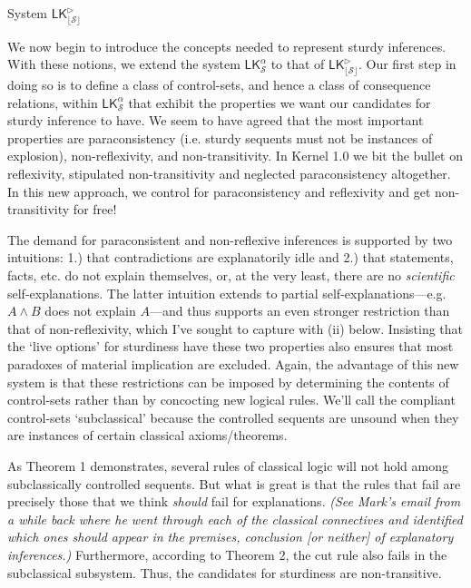 \documentclass{article}                     %
\theoremstyle{theorem}
\theoremstyle{corollary}
\theoremstyle{lemma}
\theoremstyle{definition}
\theoremstyle{remark}
\theoremstyle{definition}
\theoremstyle{notation}
\theoremstyle{definition}
\theoremstyle{proposition}
\theoremstyle{definition}
\begin{document}
\newpage



{\large System $ \mathsf{LK}^{\rhd}_{\mathcal{\lfloor S \rfloor}} $ }
\vspace{2mm}

We now begin to introduce the concepts needed to represent sturdy inferences. With these notions, we extend the system $ \mathsf{LK}^\alpha_\mathcal{S} $ to that of $ \mathsf{LK}^\rhd_\mathcal{\lfloor S \rfloor} $. Our first step in doing so is to define a class of control-sets, and hence a class of consequence relations, within $ \mathsf{LK}^\alpha_\mathcal{S} $ that exhibit the properties we want our candidates for sturdy inference to have. We seem to have agreed that the most important properties are paraconsistency (i.e. sturdy sequents must not be instances of explosion), non-reflexivity, and non-transitivity. In Kernel 1.0 we bit the bullet on reflexivity, stipulated non-transitivity and neglected paraconsistency altogether. In this new approach, we control for paraconsistency and reflexivity and get non-transitivity for free!

The demand for paraconsistent and non-reflexive inferences is supported by two intuitions: 1.) that contradictions are explanatorily idle and 2.) that statements, facts, etc. do not explain themselves, or, at the very least, there are no \textit{scientific} self-explanations. The latter intuition extends to partial self-explanations---e.g. $A \wedge B $ does not explain $A$---and thus supports an even stronger restriction than that of non-reflexivity, which I've sought to capture with (ii) below. Insisting that the `live options' for sturdiness have these two properties also ensures that most paradoxes of material implication are excluded. Again, the advantage of this new system is that these restrictions can be imposed by determining the contents of control-sets rather than by concocting new logical rules. We'll call the compliant control-sets `subclassical' because the controlled sequents are unsound when they are instances of certain classical axioms/theorems. 

As Theorem 1 demonstrates, several rules of classical logic will not hold among subclassically controlled sequents. But what is great is that the rules that fail are precisely those that we think \textit{should} fail for explanations. \textit{(See Mark's email from a while back where he went through each of the classical connectives and identified which ones should appear in the premises, conclusion [or neither] of explanatory inferences.)} Furthermore, according to Theorem 2, the cut rule also fails in the subclassical subsystem. Thus, the candidates for sturdiness are non-transitive.
\end{document}
